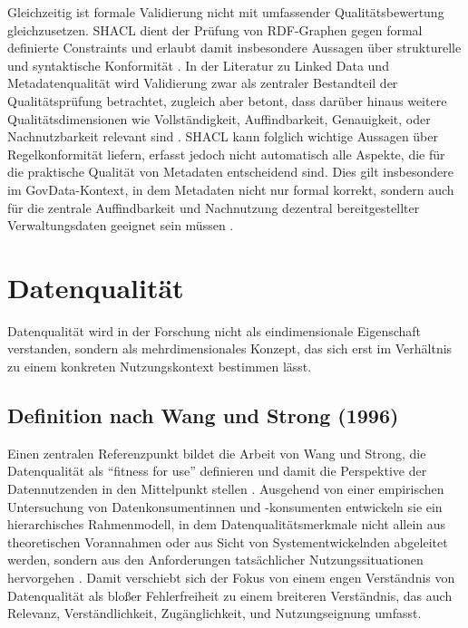 Gleichzeitig ist formale Validierung nicht mit umfassender Qualitätsbewertung gleichzusetzen. 
SHACL dient der Prüfung von RDF-Graphen gegen formal definierte Constraints und erlaubt damit insbesondere Aussagen über strukturelle und syntaktische Konformität \cite{W3CSHACL}.
In der Literatur zu Linked Data und Metadatenqualität wird Validierung zwar als zentraler Bestandteil der Qualitätsprüfung betrachtet, zugleich aber betont, dass darüber hinaus weitere Qualitätsdimensionen wie Vollständigkeit, Auffindbarkeit, Genauigkeit, oder Nachnutzbarkeit relevant sind \cite{Gayo2015LinkedDataValidationQuality,Neumaier2016MetadataQuality,Zaveri2016LinkedDataQuality}.
SHACL kann folglich wichtige Aussagen über Regelkonformität liefern, erfasst jedoch nicht automatisch alle Aspekte, die für die praktische Qualität von Metadaten entscheidend sind.
Dies gilt insbesondere im GovData-Kontext, in dem Metadaten nicht nur formal korrekt, sondern auch für die zentrale Auffindbarkeit und Nachnutzung dezentral bereitgestellter Verwaltungsdaten geeignet sein müssen \cite{FitkoGovdata}.

\section{Datenqualität}
\label{sec:datenqualitaet}

Datenqualität wird in der Forschung nicht als eindimensionale Eigenschaft verstanden, sondern als mehrdimensionales Konzept, das sich erst im Verhältnis zu einem konkreten Nutzungskontext bestimmen lässt.

\subsection{Definition nach Wang und Strong (1996)}
\label{sec:wang_strong_definition_quality}

Einen zentralen Referenzpunkt bildet die Arbeit von Wang und Strong, die Datenqualität als \enquote{fitness for use} definieren und damit die Perspektive der Datennutzenden in den Mittelpunkt stellen \cite{wang1996beyond}. Ausgehend von einer empirischen Untersuchung von Datenkonsumentinnen und -konsumenten entwickeln sie ein hierarchisches Rahmenmodell, in dem Datenqualitätsmerkmale nicht allein aus theoretischen Vorannahmen oder aus Sicht von Systementwickelnden abgeleitet werden, sondern aus den Anforderungen tatsächlicher Nutzungssituationen hervorgehen \cite{wang1996beyond}. Damit verschiebt sich der Fokus von einem engen Verständnis von Datenqualität als bloßer Fehlerfreiheit zu einem breiteren Verständnis, das auch Relevanz, Verständlichkeit, Zugänglichkeit, und Nutzungseignung umfasst.

